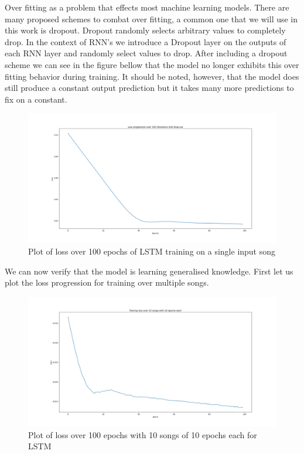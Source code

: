 \documentclass{article}
\begin{document}
Over fitting as a problem that effects most machine learning models. There are many proposed schemes to combat over fitting, a common one that we will use in this work is dropout. Dropout randomly selects arbitrary values to completely drop. In the context of RNN's we introduce a Dropout layer on the outputs of each RNN layer and randomly select values to drop. After including a dropout scheme we can see in the figure bellow that the model no longer exhibits this over fitting behavior during training. It should be noted, however, that the model does still produce a constant output prediction but it takes many more predictions to fix on a constant.
\begin{figure}[H]
\caption{Plot of loss over 100 epochs of LSTM training on a single input song}
\includegraphics[scale=0.35]{loss_dropout_100itr.png}
\end{figure}
We can now verify that the model is learning generalised knowledge. First let us plot the loss progression for training over multiple songs.
\begin{figure}[H]
\caption{Plot of loss over 100 epochs with 10 songs of 10 epochs each for LSTM}
\includegraphics[scale=0.35]{loss_plot_10songs.png}
\end{figure}
\end{document}
